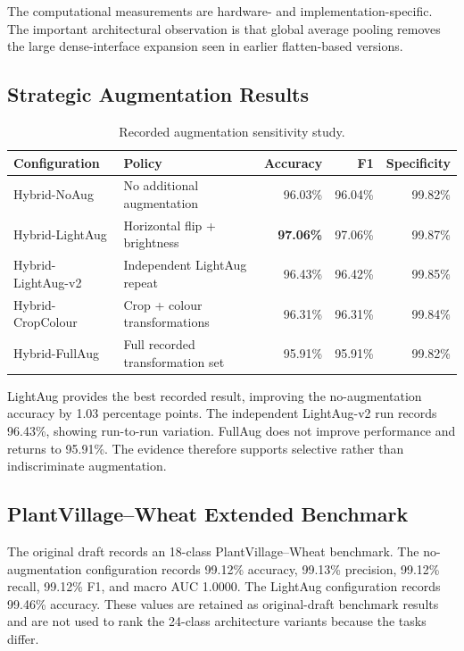 \documentclass[a4paper,fleqn]{cas-dc}
\begin{document}
The computational measurements are hardware- and implementation-specific. The important architectural observation is that global average pooling removes the large dense-interface expansion seen in earlier flatten-based versions.

\subsection{Strategic Augmentation Results}
\begin{table}[!t]
\centering
\caption{Recorded augmentation sensitivity study.}
\label{tab:augresults}
\begin{tabular}{p{3.2cm}p{6.2cm}rrr}
\toprule
Configuration & Policy & Accuracy & F1 & Specificity \\
\midrule
Hybrid-NoAug & No additional augmentation & 96.03\% & 96.04\% & 99.82\% \\
Hybrid-LightAug & Horizontal flip + brightness & \textbf{97.06\%} & 97.06\% & 99.87\% \\
Hybrid-LightAug-v2 & Independent LightAug repeat & 96.43\% & 96.42\% & 99.85\% \\
Hybrid-CropColour & Crop + colour transformations & 96.31\% & 96.31\% & 99.84\% \\
Hybrid-FullAug & Full recorded transformation set & 95.91\% & 95.91\% & 99.82\% \\
\bottomrule
\end{tabular}
\end{table}

LightAug provides the best recorded result, improving the no-augmentation accuracy by 1.03 percentage points. The independent LightAug-v2 run records 96.43\%, showing run-to-run variation. FullAug does not improve performance and returns to 95.91\%. The evidence therefore supports selective rather than indiscriminate augmentation.

\subsection{PlantVillage--Wheat Extended Benchmark}
The original draft records an 18-class PlantVillage--Wheat benchmark. The no-augmentation configuration records 99.12\% accuracy, 99.13\% precision, 99.12\% recall, 99.12\% F1, and macro AUC 1.0000. The LightAug configuration records 99.46\% accuracy. These values are retained as original-draft benchmark results and are not used to rank the 24-class architecture variants because the tasks differ.
\end{document}
